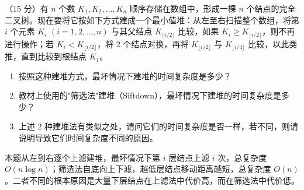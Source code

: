 \begin{question}
（15 分）有 $n$ 个数 $K_1, K_2, \dots, K_n$ 顺序存储在数组中，形成一棵 $n$ 个结点的完全二叉树。现在要将它按如下方式建成一个最小值堆：从左至右扫描整个数组，将第 $i$ 个元素 $K_i$ $(i = 1, 2, \dots, n)$ 与其父结点 $K_{\lfloor i/2 \rfloor}$ 比较，如果 $K_i \ge K_{\lfloor i/2 \rfloor}$，则不再进行操作；若 $K_i < K_{\lfloor i/2 \rfloor}$，将 2 个结点对换，再将 $K_{\lfloor i/2 \rfloor}$ 与 $K_{\lfloor i/4 \rfloor}$ 比较，以此类推，直到比较到根结点 $K_1$。

\begin{enumerate}
  \item[(1)] 按照这种建堆方式，最坏情况下建堆的时间复杂度是多少？
  \item[(2)] 教材上使用的"筛选法"建堆（Siftdown），最坏情况下建堆的时间复杂度是多少？
  \item[(3)] 上述 2 种建堆法有类似之处，请问它们的时间复杂度是否一样，若不同，则请说明导致它们时间复杂度不同的原因。
\end{enumerate}
\begin{solution}
本题从左到右逐个上滤建堆，最坏情况下第 $i$ 层结点上滤 $i$ 次，总复杂度 $O(n\log n)$；筛选法自底向上下滤，越低层结点移动距离越短，总复杂度 $O(n)$。二者不同的根本原因是大量下层结点在上滤法中代价高，而在筛选法中代价低。
\end{solution}
\end{question}

